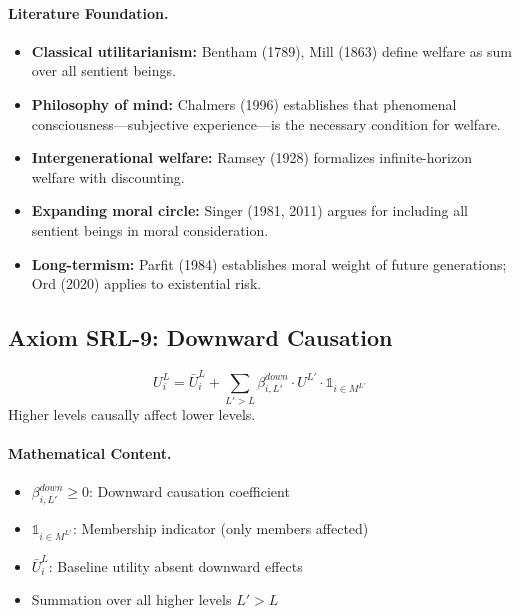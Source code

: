 \paragraph{Literature Foundation.}
\begin{itemize}
\item \textbf{Classical utilitarianism:} Bentham (1789), Mill (1863) define 
welfare as sum over all sentient beings.
\item \textbf{Philosophy of mind:} Chalmers (1996) establishes that phenomenal 
consciousness---subjective experience---is the necessary condition for welfare.
\item \textbf{Intergenerational welfare:} Ramsey (1928) formalizes infinite-horizon 
welfare with discounting.
\item \textbf{Expanding moral circle:} Singer (1981, 2011) argues for including 
all sentient beings in moral consideration.
\item \textbf{Long-termism:} Parfit (1984) establishes moral weight of future 
generations; Ord (2020) applies to existential risk.
\end{itemize}

\subsection{Axiom SRL-9: Downward Causation}

\begin{tcolorbox}[colback=gray!5!white, colframe=gray!75!black, title=Axiom SRL-9: Downward Causation]
\begin{equation}
\boxed{
U^L_i = \bar{U}^L_i + \sum_{L' > L} \beta^{down}_{i,L'} \cdot U^{L'} \cdot \mathbb{1}_{i \in M^{L'}}
}
\end{equation}
Higher levels causally affect lower levels.
\end{tcolorbox}

\paragraph{Mathematical Content.}
\begin{itemize}
\item $\beta^{down}_{i,L'} \geq 0$: Downward causation coefficient
\item $\mathbb{1}_{i \in M^{L'}}$: Membership indicator (only members affected)
\item $\bar{U}^L_i$: Baseline utility absent downward effects
\item Summation over all higher levels $L' > L$
\end{itemize}

